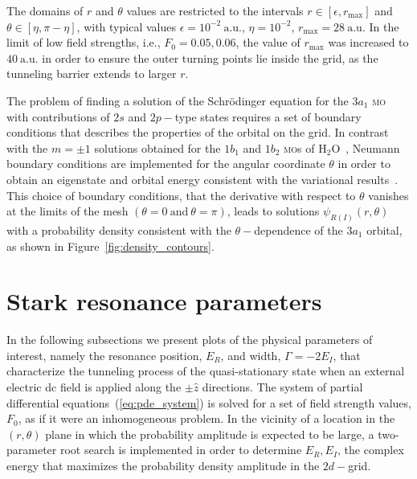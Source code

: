 The domains of $r$ and $\theta$ values are restricted to the intervals
$r\in[\epsilon, r_{\mathrm{max}}]$ and $\theta\in[\eta,\pi-\eta]$,
with typical values $\epsilon = 10^{-2}\ \mathrm{a.u.}$, $\eta =
10^{-2}$, $r_{\mathrm{max}} = 28\ \mathrm{a.u.}$ In the limit of low
field strengths, i.e., $F_{0} = 0.05, 0.06$, the value of
$r_{\mathrm{max}}$ was increased to $40\ \mathrm{a.u.}$ in order to
ensure the outer turning points lie inside the grid, as the tunneling
barrier extends to larger $r$.

The problem of finding a solution of the Schr\"{o}dinger equation for
the $3a_{1}$ \textsc{mo} with contributions of $2s$ and $2p-$type
states requires a set of boundary conditions that describes the
properties of the orbital on the grid. In contrast with the $m = \pm
1$ solutions obtained for the $1b_{1}$ and $1b_{2}$ \textsc{mo}s of
H$_{2}$O~\cite{sarias_2016}, Neumann boundary conditions are
implemented for the angular coordinate $\theta$ in order to obtain an
eigenstate and orbital energy consistent with the variational
results~\cite{Moccia_1964}. This choice of boundary conditions, that
the derivative with respect to $\theta$ vanishes at the limits of the
mesh $(\theta = 0 ~\mathrm{and}~ \theta = \pi)$, leads to solutions
$\psi_{R(I)}(r,\theta)$ with a probability density consistent with the
$\theta-$dependence of the $3a_{1}$ orbital, as shown in
Figure~\ref{fig:density_contours}.


\section{Stark resonance parameters}
\label{ch:stark_params}

In the following subsections we present plots of the physical
parameters of interest, namely the resonance position, $E_{R}$, and
width, $\Gamma = -2E_{I}$, that characterize the tunneling process of
the quasi-stationary state when an external electric dc field is
applied along the $\pm\hat{z}$ directions. The system of partial
differential equations~(\ref{eq:pde_system}) is solved for a set of
field strength values, $F_{0}$, as if it were an inhomogeneous
problem. In the vicinity of a location in the $(r,\theta)$ plane in
which the probability amplitude is expected to be large, a
two-parameter root search is implemented in order to determine
${E_{R}, E_{I}}$, the complex energy that maximizes the probability
density amplitude in the $2d-$grid.

